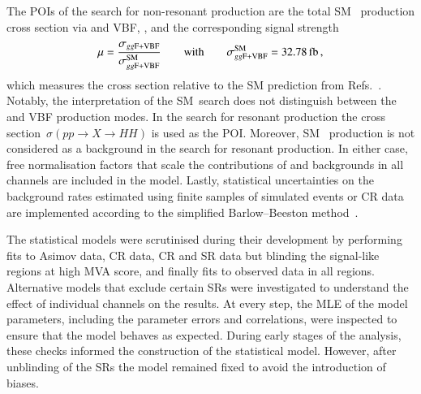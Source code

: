 The POIs of the search for non-resonant \HH production are the total SM~\HH
production cross section via \ggF and VBF, \xsecggfvbf, and the corresponding
signal strength
\begin{align*}
  \mu = \frac{\xsecggfvbf}{\xsecggfvbf^{\text{SM}}}
  \qquad \text{with} \qquad
  \xsecggfvbf^{\text{SM}} = \SI{32.78}{\femto\barn}
  \,\text{,}
\end{align*}
which measures the cross section relative to the SM prediction from
Refs.~\cite{Grazzini:2018bsd,Dreyer:2018qbw}. Notably, the interpretation of the
SM~\HH search does not distinguish between the \ggF and VBF production modes.
In the search for resonant \HH production the cross
section~$\sigma(pp \to X \to HH)$ is used as the POI. Moreover, SM~\HH
production is not considered as a background in the search for resonant \HH
production. In either case, free normalisation factors that scale the
contributions of \ZHF and \ttbar backgrounds in all channels are included in the
model. Lastly, statistical uncertainties on the background rates estimated using
finite samples of simulated events or CR data are implemented according to the
simplified Barlow--Beeston method~\cite{barlow1993,conway2011}.




The statistical models were scrutinised during their development by performing
fits to Asimov data, CR data, CR and SR data but blinding the signal-like
regions at high MVA score, and finally fits to observed data in all
regions. Alternative models that exclude certain SRs were investigated to
understand the effect of individual channels on the results. At every step, the
MLE of the model parameters, including the parameter errors and correlations,
were inspected to ensure that the model behaves as expected. During early stages
of the analysis, these checks informed the construction of the statistical
model. However, after unblinding of the SRs the model remained fixed to avoid
the introduction of biases.


